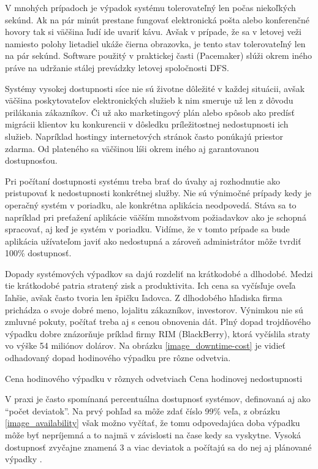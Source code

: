 V mnohých prípadoch je výpadok systému tolerovateľný len počas niekoľkých sekúnd. Ak na pár minút prestane fungovať elektronická pošta alebo konferenčné hovory tak si väčšina ľudí ide uvariť kávu. Avšak v prípade, že sa v letovej veži namiesto polohy lietadiel ukáže čierna obrazovka, je tento stav tolerovateľný len na pár sekúnd. Software použitý v praktickej časti (Pacemaker) slúži okrem iného práve na udržanie stálej prevádzky letovej spoločnosti DFS.

Systémy vysokej dostupnosti síce nie sú životne dôležité v každej situácii, avšak väčšina poskytovateľov elektronických služieb k nim smeruje už len z dôvodu prilákania zákazníkov. Či už ako marketingový plán alebo spôsob ako predísť migrácii klientov ku konkurencii v dôsledku príležitostnej nedostupnosti ich služieb. Napríklad hostingy internetových stránok často ponúkajú priestor zdarma. Od plateného sa väčšinou líši okrem iného aj garantovanou dostupnosťou.

Pri počítaní dostupnosti systému treba brať do úvahy aj rozhodnutie ako pristupovať k nedostupnosti konkrétnej služby. Nie sú výnimočné prípady kedy je operačný systém v poriadku, ale konkrétna aplikácia neodpovedá. Stáva sa to napríklad pri preťažení aplikácie väčším množstvom požiadavkov ako je schopná spracovať, aj keď je systém v poriadku. Vidíme, že v tomto prípade sa bude aplikácia užívateľom javiť ako nedostupná a zároveň administrátor môže tvrdiť 100\% dostupnosť.

Dopady systémových výpadkov sa dajú rozdeliť na krátkodobé a dlhodobé. Medzi tie krátkodobé patria stratený zisk a produktivita. Ich cena sa vyčísľuje oveľa ľahšie, avšak často tvoria len špičku ľadovca. Z dlhodobého hľadiska firma prichádza o svoje dobré meno, lojalitu zákazníkov, investorov. Výnimkou nie sú zmluvné pokuty, počítať treba aj s cenou obnovenia dát. Plný dopad trojdňového výpadku dobre znázorňuje príklad firmy RIM (BlackBerry), ktorá vyčíslila straty vo výške 54 miliónov dolárov. Na obrázku \ref{image_downtime-cost} je vidieť odhadovaný dopad hodinového výpadku pre rôzne odvetvia.

 {Cena hodinového výpadku v rôznych odvetviach \cite{pdf:managing-the-cost-of-downtime}} {Cena hodinovej nedostupnosti}

V praxi je často spomínaná percentuálna dostupnosť systémov, definovaná aj ako "`počet deviatok"'. Na prvý pohľad sa môže zdať číslo 99\% veľa, z obrázku \ref{image_availability} však možno vyčítať, že tomu odpovedajúca doba výpadku môže byť nepríjemná a to najmä v závislosti na čase kedy sa vyskytne. Vysoká dostupnosť zvyčajne znamená 3 a viac deviatok a počítajú sa do nej aj plánované výpadky \cite{pdf:ha-and-disaster-recovery}.

